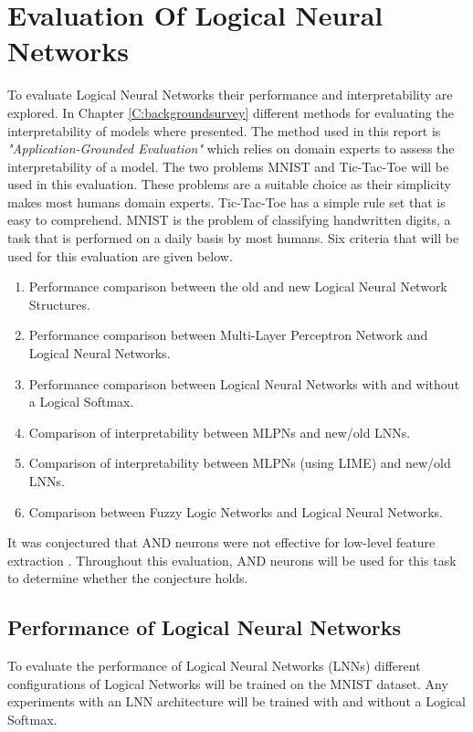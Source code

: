 \chapter{Evaluation Of Logical Neural Networks} \label{C:evaluation-lnn}
To evaluate Logical Neural Networks their performance and interpretability are explored. In Chapter \ref{C:backgroundsurvey} different methods for evaluating the interpretability of models where presented. The method used in this report is \textit{"Application-Grounded Evaluation"} \cite{doshi2017towards} which relies on domain experts to assess the interpretability of a model. The two problems MNIST \cite{mnistlecun} and Tic-Tac-Toe \cite{Lichman:2013} will be used in this evaluation. These problems are a suitable choice as their simplicity makes most humans domain experts. Tic-Tac-Toe has a simple rule set that is easy to comprehend. MNIST is the problem of classifying handwritten digits, a task that is performed on a daily basis by most humans. Six criteria that will be used for this evaluation are given below.

\begin{enumerate}
	\item Performance comparison between the old and new Logical Neural Network Structures.
	\item Performance comparison between Multi-Layer Perceptron Network and Logical Neural Networks.
	\item Performance comparison between Logical Neural Networks with and without a Logical Softmax.
	\item Comparison of interpretability between MLPNs and new/old LNNs.
	\item Comparison of interpretability between MLPNs (using LIME) and new/old LNNs.
	\item Comparison between Fuzzy Logic Networks and Logical Neural Networks.
\end{enumerate}

It was conjectured that AND neurons were not effective for low-level feature extraction \cite{LearningLogicalActivations}. Throughout this evaluation, AND neurons will be used for this task to determine whether the conjecture holds.


\section{Performance of Logical Neural Networks} \label{sec:lnn-eval-peformance}
To evaluate the performance of Logical Neural Networks (LNNs) different configurations of Logical Networks will be trained on the MNIST dataset. Any experiments with an LNN architecture will be trained with and without a Logical Softmax.

